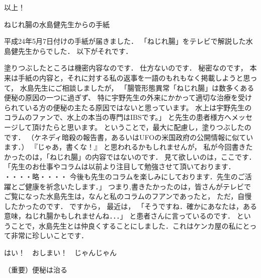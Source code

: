 以上！

ねじれ腸の水島健先生からの手紙

平成24年5月7日付けの手紙が届きました．
「ねじれ腸」をテレビで解説した水島健先生からでした．
以下がそれです．


塗りつぶしたところは機密内容なのです．
仕方ないのです． 秘密なのです，
本来は手紙の内容と，それに対する私の返事を一語のもれもなく掲載しようと思って， 
水島先生にご相談しましたが，
「腸管形態異常「ねじれ腸」は数多くある便秘の原因の一つに過ぎず、
特に宇野先生の外来にかかって適切な治療を受けられている方の便秘の主たる原因ではないと思っています。
水上は宇野先生のコラムのファンで、水上の本当の専門はIBSです。」
と先生の患者様方へメッセージして頂けたらと思います。
ということで，最大に配慮し，塗りつぶしたのです．
（ケネディ暗殺の報告書，あるいはUFOの米国政府の公開情報に似ています．） 
『じゃあ，書くな！』
と思われるかもしれませんが，
私が今回書きたかったのは，「ねじれ腸」の内容ではないのです．
見て欲しいのは，ここです．
「先生のお仕事やコラムは以前より注目して勉強させて頂いております．
・・・・略・・・・ 今後も先生のコラムを楽しみにしております．先生のご活躍とご健康を祈念いたします．」
つまり,書きたかったのは，皆さんがテレビでご覧になった水島先生は，なんと私のコラムのフアンであったと，
ただ，自慢したかったのです．
ですから，
最近は，
「そうですね．確かにあなたは，ある意味，ねじれ腸かもしれませんね．．．」
と患者さんに言っているのです．
ということで，水島先生とは仲良くすることにしました．これはケンカ屋の私にとって非常に珍しいことです． 

はい！　おしまい！　じゃんじゃん

（重要）便秘は治る

